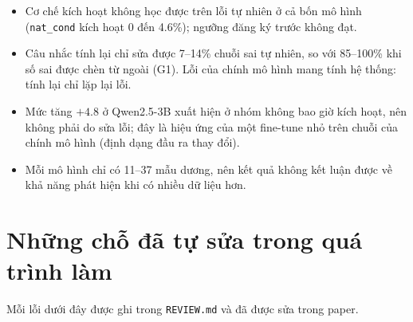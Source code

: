 \documentclass[11pt]{article}
\begin{document}
\begin{cachdoc}
\begin{itemize}[leftmargin=*,itemsep=1pt]
\item Cơ chế kích hoạt không học được trên lỗi tự nhiên ở cả bốn mô hình (\texttt{nat\_cond} kích hoạt 0 đến 4.6\%);
  ngưỡng đăng ký trước không đạt.
\item Câu nhắc tính lại chỉ sửa được 7--14\% chuỗi sai tự nhiên, so với 85--100\% khi số sai được chèn từ ngoài
  (G1). Lỗi của chính mô hình mang tính hệ thống: tính lại chỉ lặp lại lỗi.
\item Mức tăng $+4.8$ ở Qwen2.5-3B xuất hiện ở nhóm không bao giờ kích hoạt, nên không phải do sửa lỗi; đây là hiệu
  ứng của một fine-tune nhỏ trên chuỗi của chính mô hình (định dạng đầu ra thay đổi).
\item Mỗi mô hình chỉ có 11--37 mẫu dương, nên kết quả không kết luận được về khả năng phát hiện khi có nhiều dữ liệu
  hơn.
\end{itemize}
\end{cachdoc}

\section{Những chỗ đã tự sửa trong quá trình làm}

Mỗi lỗi dưới đây được ghi trong \texttt{REVIEW.md} và đã được sửa trong paper.
\end{document}
